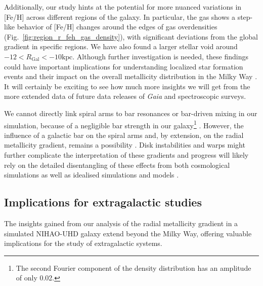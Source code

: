 \documentclass[twocolumn,apj,numberedappendix,appendixfloats,twocolappendix]{openjournal}
\begin{document}
\begin{CJK*}{UTF8}{gbsn}
Additionally, our study hints at the potential for more nuanced variations in [Fe/H] across different regions of the galaxy. In particular, the gas shows a step-like behavior of [Fe/H] changes around the edges of gas overdensities (Fig.~\ref{fig:region_r_feh_gas_density}), with significant deviations from the global gradient in specific regions. We have also found a larger stellar void around $-12 < R_\mathrm{Gal} < -10\mathrm{kpc}$. Although further investigation is needed, these findings could have important implications for understanding localized star formation events and their impact on the overall metallicity distribution in the Milky Way \citep{Sanchez2014, SanchezBlazquez2014, Ho2015}. It will certainly be exciting to see how much more insights \citep{Poggio2021, Hackshaw2024} we will get from the more extended data of future data releases of \textit{Gaia} and spectroscopic surveys.

We cannot directly link spiral arms to bar resonances or bar-driven mixing in our simulation, because of a negligible bar strength in our galaxy\footnote{The second Fourier component of the density distribution has an amplitude of only 0.02.} \citep[but see][]{Minchev2010, DiMatteo2013}. However, the influence of a galactic bar on the spiral arms and, by extension, on the radial metallicity gradient, remains a possibility \citep[see again][]{Chen2023}. Disk instabilities and warps might further complicate the interpretation of these gradients and progress will likely rely on the detailed disentangling of these effects from both cosmological simulations as well as idealised simulations and models \citep{Minchev2013, Grand2015, Grand2016, Krumholz2018, Sharda2021, BlandHawthorn2024, TepperGarcia2024}.

\subsection{Implications for extragalactic studies} \label{sec:implications_extragalactic}

The insights gained from our analysis of the radial metallicity gradient in a simulated NIHAO-UHD galaxy extend beyond the Milky Way, offering valuable implications for the study of extragalactic systems.


\end{CJK*}
\end{document}
